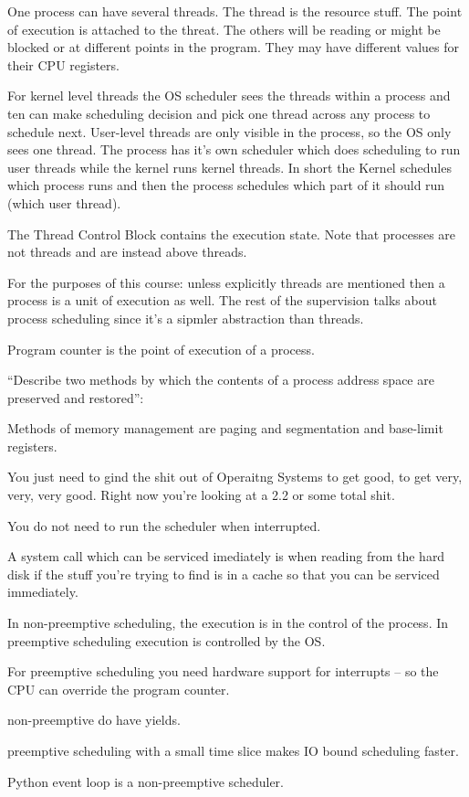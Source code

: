 \documentclass[10pt,\jkfside,a4paper]{article}
\begin{document}
One process can have several threads. The thread is the resource stuff. The point of execution is 
attached to the threat. The others will be reading or might be blocked or at different points in the 
program. They may have different values for their CPU registers. 

For kernel level threads the OS scheduler sees the threads within a process and ten can make scheduling 
decision and pick one thread across any process to schedule next. User-level threads are only visible 
in the process, so the OS only sees one thread. The process has it's own scheduler which does scheduling 
to run user threads while the kernel runs kernel threads. In short the Kernel schedules which process 
runs and then the process schedules which part of it should run (which user thread).

The Thread Control Block contains the execution state. Note that processes are not threads and are instead 
above threads.

For the purposes of this course: unless explicitly threads are mentioned then a process is a unit of 
execution as well. The rest of the supervision talks about process scheduling since it's a sipmler 
abstraction than threads.

\vspace{0.5cm}

Program counter is the point of execution of a process.

``Describe two methods by which the contents of a process address space are preserved and restored'':

Methods of memory management are paging and segmentation and base-limit registers.

You just need to gind the shit out of Operaitng Systems to get good, to get very, very, very good. 
Right now you're looking at a 2.2 or some total shit.

You do not need to run the scheduler when interrupted.

A system call which can be serviced imediately is when reading from the hard disk if the stuff you're trying 
to find is in a cache so that you can be serviced immediately. 

In non-preemptive scheduling, the execution is in the control of the process. In preemptive scheduling 
execution is controlled by the OS.

For preemptive scheduling you need hardware support for interrupts -- so the CPU can override the program counter. 

non-preemptive do have yields.

preemptive scheduling with a small time slice makes IO bound scheduling faster.

Python event loop is a non-preemptive scheduler.
\end{document}
